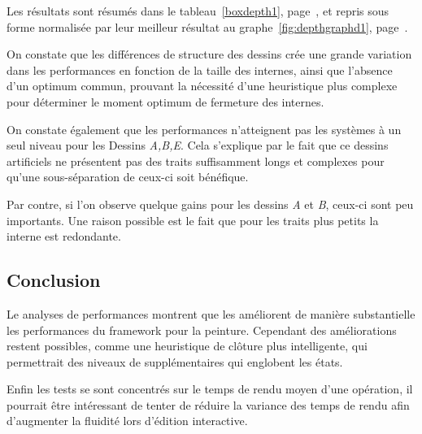 				Les résultats sont résumés dans le tableau~\ref{boxdepth1}, page~\pageref{boxdepth1}, et repris sous forme normalisée par leur
				meilleur résultat au graphe~\ref{fig:depthgraphd1}, page~\pageref{fig:depthgraphd1}. 

				On constate que les différences de structure des dessins crée une grande variation dans les performances en fonction de
				la taille des \BO internes, ainsi que l'absence d'un optimum commun, prouvant la nécessité d'une heuristique plus complexe
				pour déterminer le moment optimum de fermeture des \BO internes. 

				On constate également que les performances n'atteignent pas les systèmes à un seul niveau pour les Dessins \emph{A,B,E}.
				Cela s'explique par le fait que ce dessins artificiels ne présentent pas des traits suffisamment longs et complexes pour 
				qu'une sous-séparation de ceux-ci soit bénéfique. 

				Par contre, si l'on observe quelque gains pour les dessins \emph{A} et \emph{B}, ceux-ci sont peu importants. Une raison possible
				est le fait que pour les traits plus petits la \BO interne est redondante. 
				
			\subsection{Conclusion}
				Le analyses de performances montrent que les \BO améliorent de manière substantielle les performances du framework pour la peinture.
				Cependant des améliorations restent possibles, comme une heuristique de clôture plus intelligente, qui permettrait des niveaux de 
				\BO supplémentaires qui englobent les états. 

				Enfin les tests se sont concentrés sur le temps de rendu moyen d'une opération, il pourrait être intéressant de tenter de réduire
				la variance des temps de rendu afin d'augmenter la fluidité lors d'édition interactive. 

